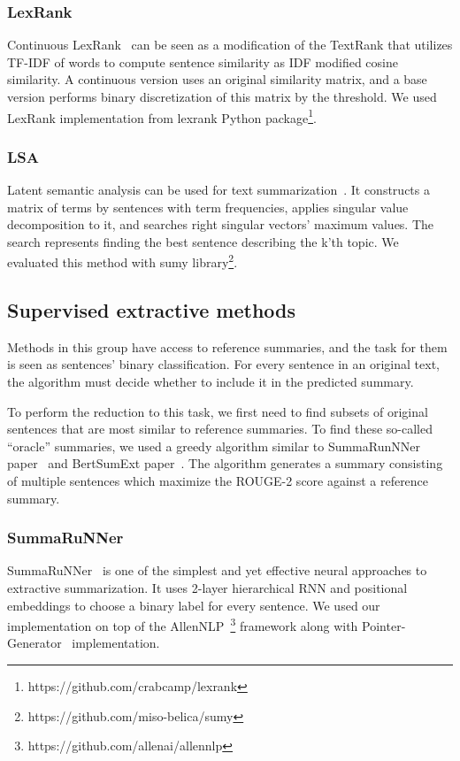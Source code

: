 \documentclass[runningheads]{llncs}
\begin{document}
\subsubsection{LexRank}
Continuous LexRank~\cite{lexrank} can be seen as a modification of the TextRank that utilizes TF-IDF of words to compute sentence similarity as IDF modified cosine similarity. A continuous version uses an original similarity matrix, and a base version performs binary discretization of this matrix by the threshold. We used LexRank implementation from lexrank Python package\footnote{https://github.com/crabcamp/lexrank}.

\subsubsection{LSA}
Latent semantic analysis can be used for text summarization~\cite{lsa}. It constructs a matrix of terms by sentences with term frequencies, applies singular value decomposition to it, and searches right singular vectors' maximum values. The search represents finding the best sentence describing the k'th topic. We evaluated this method with sumy library\footnote{https://github.com/miso-belica/sumy}.

\subsection{Supervised extractive methods} \label{sem}

Methods in this group have access to reference summaries, and the task for them is seen as sentences' binary classification. For every sentence in an original text, the algorithm must decide whether to include it in the predicted summary.

To perform the reduction to this task, we first need to find subsets of original sentences that are most similar to reference summaries. To find these so-called ``oracle'' summaries, we used a greedy algorithm similar to SummaRunNNer paper~\cite{summarunner} and BertSumExt paper~\cite{presumm}. The algorithm generates a summary consisting of multiple sentences which maximize the ROUGE-2 score against a reference summary.

\subsubsection{SummaRuNNer}
SummaRuNNer~\cite{summarunner} is one of the simplest and yet effective neural approaches to extractive summarization. It uses 2-layer hierarchical RNN and positional embeddings to choose a binary label for every sentence. We used our implementation on top of the AllenNLP~\cite{allennlp}\footnote{https://github.com/allenai/allennlp} framework along with Pointer-Generator~\cite{pg} implementation.
\end{document}
